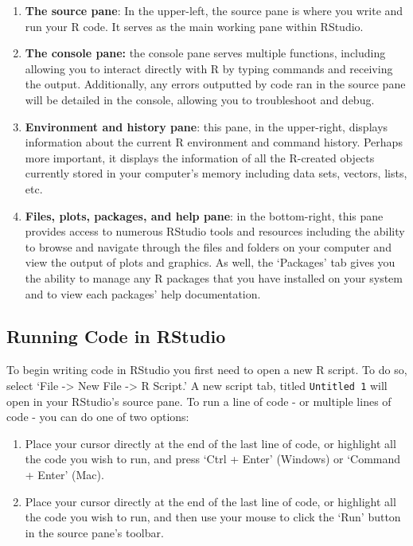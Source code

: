 \documentclass[
  letterpaper,
]{krantz}
\providecommand{\tightlist}{%
  \setlength{\itemsep}{0pt}\setlength{\parskip}{0pt}}\usepackage{longtable,booktabs,array}
\begin{document}
\begin{enumerate}
\def\labelenumi{\arabic{enumi}.}
\tightlist
\item
  \textbf{The source pane}: In the upper-left, the source pane is where
  you write and run your R code. It serves as the main working pane
  within RStudio.
\item
  \textbf{The console pane:} the console pane serves multiple functions,
  including allowing you to interact directly with R by typing commands
  and receiving the output. Additionally, any errors outputted by code
  ran in the source pane will be detailed in the console, allowing you
  to troubleshoot and debug.
\item
  \textbf{Environment and history pane}: this pane, in the upper-right,
  displays information about the current R environment and command
  history. Perhaps more important, it displays the information of all
  the R-created objects currently stored in your computer's memory
  including data sets, vectors, lists, etc.
\item
  \textbf{Files, plots, packages, and help pane}: in the bottom-right,
  this pane provides access to numerous RStudio tools and resources
  including the ability to browse and navigate through the files and
  folders on your computer and view the output of plots and graphics. As
  well, the `Packages' tab gives you the ability to manage any R
  packages that you have installed on your system and to view each
  packages' help documentation.
\end{enumerate}

\hypertarget{running-code-in-rstudio}{%
\subsection{Running Code in RStudio}\label{running-code-in-rstudio}}

To begin writing code in RStudio you first need to open a new R script.
To do so, select `File -\textgreater{} New File -\textgreater{} R
Script.' A new script tab, titled \texttt{Untitled\ 1} will open in your
RStudio's source pane. To run a line of code - or multiple lines of code
- you can do one of two options:

\begin{enumerate}
\def\labelenumi{\arabic{enumi}.}
\tightlist
\item
  Place your cursor directly at the end of the last line of code, or
  highlight all the code you wish to run, and press `Ctrl + Enter'
  (Windows) or `Command + Enter' (Mac).
\item
  Place your cursor directly at the end of the last line of code, or
  highlight all the code you wish to run, and then use your mouse to
  click the `Run' button in the source pane's toolbar.
\end{enumerate}
\end{document}
